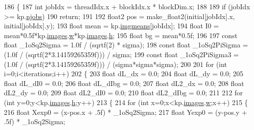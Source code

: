 \begin{DoxyCode}
186 \{
187     \textcolor{keywordtype}{int} jobIdx = threadIdx.x + blockIdx.x * blockDim.x;
188 
189     \textcolor{keywordflow}{if} (jobIdx >= kp.\hyperlink{struct_base_kernel_params_aec40d44810d0e0a6640c66038af1fbf2}{njobs})
190         \textcolor{keywordflow}{return};
191 
192     float2 pos = make\_float2(initial[jobIdx].x, initial[jobIdx].y);
193     \textcolor{keywordtype}{float} mean = kp.\hyperlink{struct_base_kernel_params_aa0c58be6d25ab55207ca83bb0047f4d9}{imgmeans}[jobIdx];
194     \textcolor{keywordtype}{float} I0 = mean*0.5f*kp.\hyperlink{struct_base_kernel_params_abdd6b8722cb871a13069ba0e3cd3ab0b}{images}.\hyperlink{structcuda_image_list_a1fe4adbbd48678e07c6b58f50dbe8528}{w}*kp.\hyperlink{struct_base_kernel_params_abdd6b8722cb871a13069ba0e3cd3ab0b}{images}.\hyperlink{structcuda_image_list_a90c8a96b431b4faa4759987f44d06123}{h};
195     \textcolor{keywordtype}{float} bg = mean*0.5f;
196 
197     \textcolor{keyword}{const} \textcolor{keywordtype}{float} \_1oSq2Sigma = 1.0f / (sqrtf(2) * sigma);
198     \textcolor{keyword}{const} \textcolor{keywordtype}{float} \_1oSq2PiSigma = (1.0f / (sqrtf(2*3.14159265359f))) / sigma;
199     \textcolor{keyword}{const} \textcolor{keywordtype}{float} \_1oSq2PiSigma3 = (1.0f / (sqrtf(2*3.14159265359f))) / (sigma*sigma*sigma);
200 
201     \textcolor{keywordflow}{for} (\textcolor{keywordtype}{int} i=0;i<iterations;i++)
202     \{
203         \textcolor{keywordtype}{float} dL\_dx = 0.0; 
204         \textcolor{keywordtype}{float} dL\_dy = 0.0; 
205         \textcolor{keywordtype}{float} dL\_dI0 = 0.0;
206         \textcolor{keywordtype}{float} dL\_dIbg = 0.0;
207         \textcolor{keywordtype}{float} dL2\_dx = 0.0;
208         \textcolor{keywordtype}{float} dL2\_dy = 0.0;
209         \textcolor{keywordtype}{float} dL2\_dI0 = 0.0;
210         \textcolor{keywordtype}{float} dL2\_dIbg = 0.0;
211                 
212         \textcolor{keywordflow}{for} (\textcolor{keywordtype}{int} y=0;y<kp.\hyperlink{struct_base_kernel_params_abdd6b8722cb871a13069ba0e3cd3ab0b}{images}.\hyperlink{structcuda_image_list_a90c8a96b431b4faa4759987f44d06123}{h};y++)
213         \{
214             \textcolor{keywordflow}{for} (\textcolor{keywordtype}{int} x=0;x<kp.\hyperlink{struct_base_kernel_params_abdd6b8722cb871a13069ba0e3cd3ab0b}{images}.\hyperlink{structcuda_image_list_a1fe4adbbd48678e07c6b58f50dbe8528}{w};x++)
215             \{
216                 \textcolor{keywordtype}{float} Xexp0 = (x-pos.x + .5f) * \_1oSq2Sigma;
217                 \textcolor{keywordtype}{float} Yexp0 = (y-pos.y + .5f) * \_1oSq2Sigma;

\end{DoxyCode}
